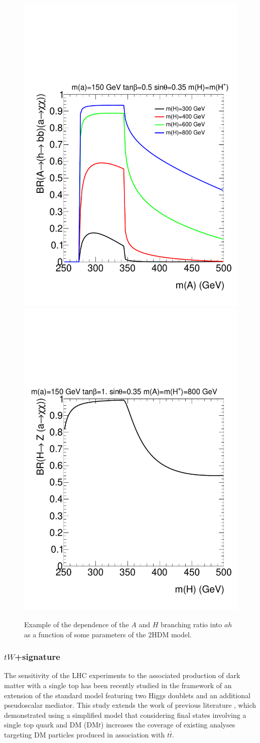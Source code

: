 \begin{figure}
\centering
\includegraphics[width=.48\textwidth]{texinputs/04_grid/figures/DMHF/brA}
\includegraphics[width=.48\textwidth]{texinputs/04_grid/figures/DMHF/brH}
\caption{Example of the dependence of the $A$ and $H$ branching ratio into $ah$ as a function of some parameters of the 2HDM model.}
\label{fig:brAHah}
\end{figure}

\subsubsection{$tW$+\met signature}

The sensitivity of the LHC experiments to the associated production of dark matter with a single top has been recently studied \cite{Pani:2017qyd} in the framework of an extension of the standard model featuring two Higgs doublets and an additional pseudoscalar mediator. 
This study extends the work of previous literature \cite{Pinna:2017tay}, which demonstrated using a simplified model that considering final states involving a single top quark and DM (DM$t$) increases the coverage of existing analyses targeting DM particles produced in association with $t\bar t$.  

